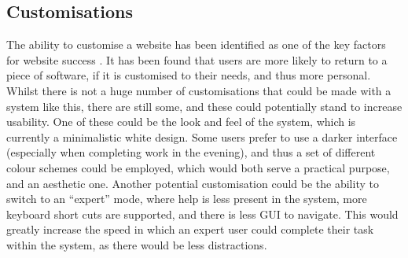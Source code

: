 \subsection{Customisations}
The ability to customise a website has been identified as one of the key factors for website success \cite{fan2010factors}. It has been found that users are more likely to return to a piece of software, if it is customised to their needs, and thus more personal. Whilst there is not a huge number of customisations that could be made with a system like this, there are still some, and these could potentially stand to increase usability. One of these could be the look and feel of the system, which is currently a minimalistic white design. Some users prefer to use a darker interface (especially when completing work in the evening), and thus a set of different colour schemes could be employed, which would both serve a practical purpose, and an aesthetic one. Another potential customisation could be the ability to switch to an ``expert'' mode, where help is less present in the system, more keyboard short cuts are supported, and there is less GUI to navigate. This would greatly increase the speed in which an expert user could complete their task within the system, as there would be less distractions.